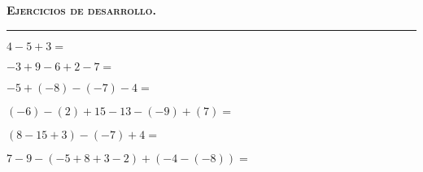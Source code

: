 \documentclass[spanish,letterpaper, 12pt, addpoints, answers]{exam}
\begin{document}
\parbox{16cm}{
{\textsc{\textbf{Ejercicios de desarrollo.}}}}

\vspace{0.15in}
\hrule 
\begin{questions}


\question[3]  $4-5+3=$\\
\vspace{2cm}

\question[3]  $-3+9-6+2-7=$\\
\vspace{2cm}

\question[3]  $-5+(-8)-(-7)-4=$\\
\vspace{3cm}

\question[3]  $(-6)-(2)+15-13-(-9)+(7)=$\\
\vspace{3cm}

\question[3]  $(8-15+3)-(-7)+4=$\\
\vspace{4cm}

\question[3]  $7-9-(-5+8+3-2)+(-4-(-8))=$\\
\vspace{4cm}

\end{questions}
\end{document}
